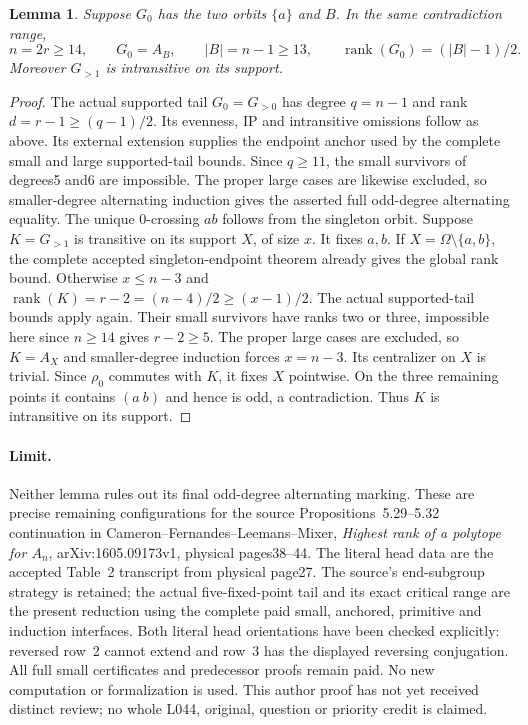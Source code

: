 \documentclass[11pt,a4paper]{article}
\newtheorem{lemma}{Lemma}
\begin{document}
\begin{lemma}
Suppose $G_0$ has the two orbits $\{a\}$ and $B$. In the same
contradiction range,
\[
 n=2r\geq14,\qquad G_0=A_B,\qquad |B|=n-1\geq13,
 \qquad \operatorname{rank}(G_0)=(|B|-1)/2.
\]
Moreover $G_{>1}$ is intransitive on its support.
\end{lemma}
\begin{proof}
The actual supported tail $G_0=G_{>0}$ has degree $q=n-1$ and
rank $d=r-1\geq(q-1)/2$. Its evenness, IP and intransitive
omissions follow as above. Its external extension supplies the
endpoint anchor used by the complete small and large supported-tail
bounds. Since $q\geq11$, the small survivors of degrees5 and6
are impossible. The proper large cases are likewise excluded, so
smaller-degree alternating induction gives the asserted full odd-degree
alternating equality.
The unique $0$-crossing $ab$ follows from the singleton orbit.
Suppose $K=G_{>1}$ is transitive on its support $X$, of size $x$.
It fixes $a,b$. If $X=\Omega\setminus\{a,b\}$, the complete
accepted singleton-endpoint theorem already gives the global rank
bound. Otherwise $x\leq n-3$ and
$\operatorname{rank}(K)=r-2=(n-4)/2\geq(x-1)/2$.
The actual supported-tail bounds apply again. Their small survivors
have ranks two or three, impossible here since $n\geq14$ gives
$r-2\geq5$. The proper large cases are excluded, so $K=A_X$ and
smaller-degree induction forces $x=n-3$. Its centralizer on $X$
is trivial. Since $\rho_0$ commutes with $K$, it fixes $X$ pointwise.
On the three remaining points it contains $(a\ b)$ and hence is
odd, a contradiction. Thus $K$ is intransitive on its support.
\end{proof}

\paragraph{Limit.}
Neither lemma rules out its final odd-degree alternating marking.
These are precise remaining configurations for the source
Propositions~5.29--5.32 continuation in Cameron--Fernandes--Leemans--Mixer,
\emph{Highest rank of a polytope for $A_n$}, arXiv:1605.09173v1,
physical pages38--44. The literal head data are the accepted
Table~2 transcript from physical page27. The source's end-subgroup
strategy is retained; the actual five-fixed-point tail and its exact
critical range are the present reduction using the complete paid
small, anchored, primitive and induction interfaces. Both literal head orientations have been checked explicitly: reversed
row~2 cannot extend and row~3 has the displayed reversing conjugation.
All full small certificates and predecessor proofs remain paid.
No new computation or formalization is used. This author proof has not yet received distinct review; no whole
L044, original, question or priority credit is claimed.
\end{document}
